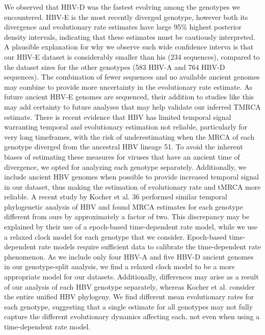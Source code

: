 We observed that HBV-D was the fastest evolving among the genotypes we encountered. HBV-E is the most recently diverged genotype, however both its divergence and evolutionary rate estimates have large 95\% highest posterior density intervals, indicating that these estimates must be cautiously interpreted. A plausible explanation for why we observe such wide confidence interva is that our HBV-E dataset is considerably smaller than his (234 sequences), compared to the dataset sizes for the other genotypes (583 HBV-A and 764 HBV-D sequences). The combination of fewer sequences and no available ancient genomes may combine to provide more uncertainty in the evolutionary rate estimate. As future ancient HBV-E genomes are sequenced, their addition to studies like this may add certainty to future analyses that may help validate our inferred TMRCA estimate.
There is recent evidence that HBV has limited temporal signal warranting temporal and evolutionary estimation not reliable, particularly for very long timeframes, with the risk of underestimating when the MRCA of each genotype diverged from the ancestral HBV lineage 51. To avoid the inherent biases of estimating these measures for viruses that have an ancient time of divergence, we opted for analyzing each genotype separately. Additionally, we include ancient HBV genomes when possible to provide increased temporal signal in our dataset, thus making the estimation of evolutionary rate and tMRCA more reliable. A recent study by Kocher et al. 36 performed similar temporal phylogenetic analysis of HBV and found MRCA estimates for each genotype different from ours by approximately a factor of two. This discrepancy may be explained by their use of a epoch-based time-dependent rate model, while we use a relaxed clock model for each genotype that we consider. Epoch-based time-dependent rate models require sufficient data to calibrate the time-dependent rate phenomenon. As we include only four HBV-A and five HBV-D ancient genomes in our genotype-split analysis, we find a relaxed clock model to be a more appropriate model for our datasets. Additionally, differences may arise as a result of our analysis of each HBV genotype separately, whereas Kocher et al. consider the entire unified HBV phylogeny. We find different mean evolutionary rates for each genotype, suggesting that a single estimate for all genotypes may not fully capture the different evolutionary dynamics affecting each, not even when using a time-dependent rate model.
